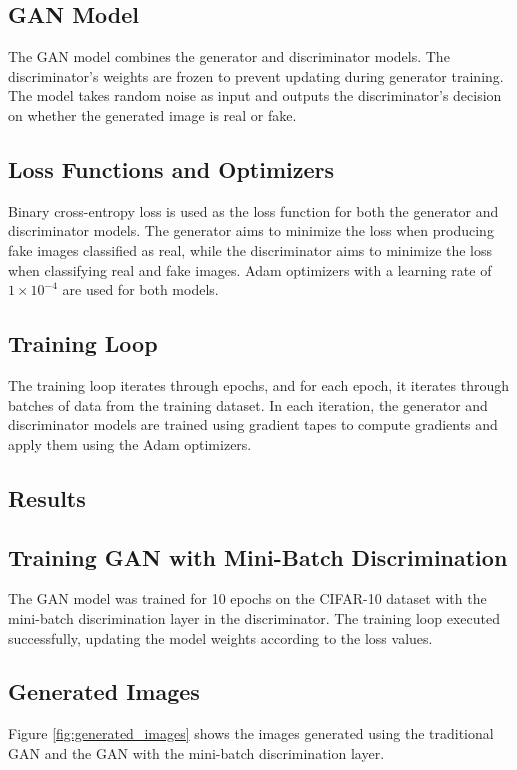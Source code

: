 \documentclass{article}
\begin{document}
\subsection{GAN Model}
The GAN model combines the generator and discriminator models. The discriminator's weights are frozen to prevent updating during generator training. The model takes random noise as input and outputs the discriminator's decision on whether the generated image is real or fake.

\subsection{Loss Functions and Optimizers}
Binary cross-entropy loss is used as the loss function for both the generator and discriminator models. The generator aims to minimize the loss when producing fake images classified as real, while the discriminator aims to minimize the loss when classifying real and fake images. Adam optimizers with a learning rate of $1 \times 10^{-4}$ are used for both models.

\subsection{Training Loop}
The training loop iterates through epochs, and for each epoch, it iterates through batches of data from the training dataset. In each iteration, the generator and discriminator models are trained using gradient tapes to compute gradients and apply them using the Adam optimizers.

\subsection{Results}

\subsection{Training GAN with Mini-Batch Discrimination}
The GAN model was trained for 10 epochs on the CIFAR-10 dataset with the mini-batch discrimination layer in the discriminator. The training loop executed successfully, updating the model weights according to the loss values.

\subsection{Generated Images}
Figure \ref{fig:generated_images} shows the images generated using the traditional GAN and the GAN with the mini-batch discrimination layer.
\end{document}

